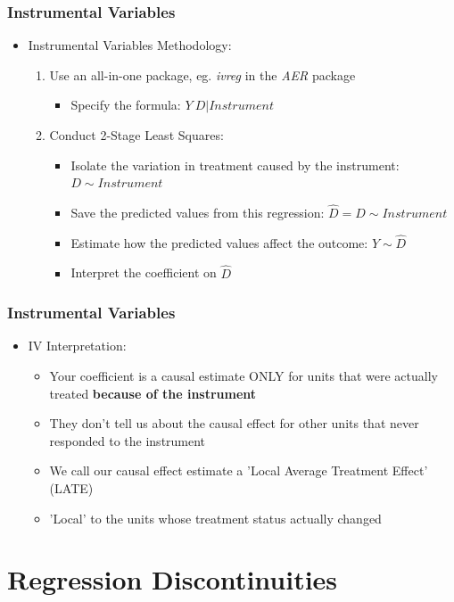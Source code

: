 \documentclass[xcolor=x11names,compress]{beamer}\usepackage[]{graphicx}\usepackage[]{color}
\renewcommand{\(}{\begin{columns}}
\renewcommand{\)}{\end{columns}}
\newcommand{\<}[1]{\begin{column}{#1}}
\renewcommand{\>}{\end{column}}
\begin{document}
\begin{frame}
\frametitle{Instrumental Variables}
\begin{itemize}
\item Instrumental Variables Methodology:
\pause
\begin{enumerate}
\item Use an all-in-one package, eg. \textit{ivreg} in the \textit{AER} package
\begin{itemize}
\item Specify the formula: $Y ~ D | Instrument$
\pause
\end{itemize}
\item Conduct 2-Stage Least Squares: 
\pause
\begin{itemize}
\item Isolate the variation in treatment caused by the instrument: $D \sim Instrument$
\pause
\item Save the predicted values from this regression: $\hat{D} = D \sim Instrument$
\pause
\item Estimate how the predicted values affect the outcome: $Y \sim \hat{D}$
\pause
\item Interpret the coefficient on $\hat{D}$
\end{itemize}
\end{enumerate}
\end{itemize}
\end{frame}

\begin{frame}
\frametitle{Instrumental Variables}
\begin{itemize}
\item IV Interpretation:
\pause
\begin{itemize}
\item Your coefficient is a causal estimate ONLY for units that were actually treated \textbf{because of the instrument}
\pause
\item They don't tell us about the causal effect for other units that never responded to the instrument
\pause
\item We call our causal effect estimate a 'Local Average Treatment Effect' (LATE)
\item 'Local' to the units whose treatment status actually changed
\end{itemize}
\end{itemize}
\end{frame}



\section{Regression Discontinuities}
\end{document}

